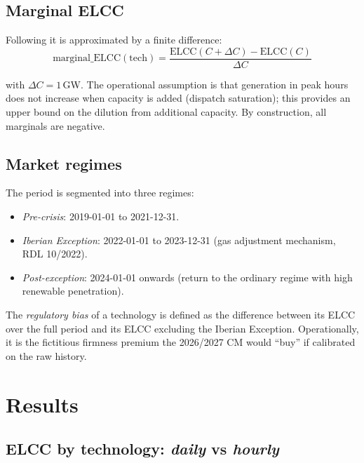 \documentclass[11pt,a4paper]{article}
\begin{document}
\subsection{Marginal ELCC}

Following \citet{millswiser2013} it is approximated by a finite difference:
\begin{equation}
\text{marginal\_ELCC}(\text{tech}) = \frac{\text{ELCC}(C+\Delta C) - \text{ELCC}(C)}{\Delta C}
\label{eq:marginal}
\end{equation}

with $\Delta C = 1$\,GW. The operational assumption is that generation in peak
hours does not increase when capacity is added (dispatch saturation); this provides
an upper bound on the dilution from additional capacity. By construction, all
marginals are negative.

\subsection{Market regimes}

The period is segmented into three regimes:
\begin{itemize}
\item \emph{Pre-crisis}: 2019-01-01 to 2021-12-31.
\item \emph{Iberian Exception}: 2022-01-01 to 2023-12-31 (gas adjustment mechanism,
      RDL 10/2022).
\item \emph{Post-exception}: 2024-01-01 onwards (return to the ordinary regime with
      high renewable penetration).
\end{itemize}

The \emph{regulatory bias} of a technology is defined as the difference between its
ELCC over the full period and its ELCC excluding the Iberian Exception.
Operationally, it is the fictitious firmness premium the 2026/2027 CM would ``buy'' if
calibrated on the raw history.

\section{Results}

\subsection{ELCC by technology: \emph{daily} vs \emph{hourly}}
\end{document}

